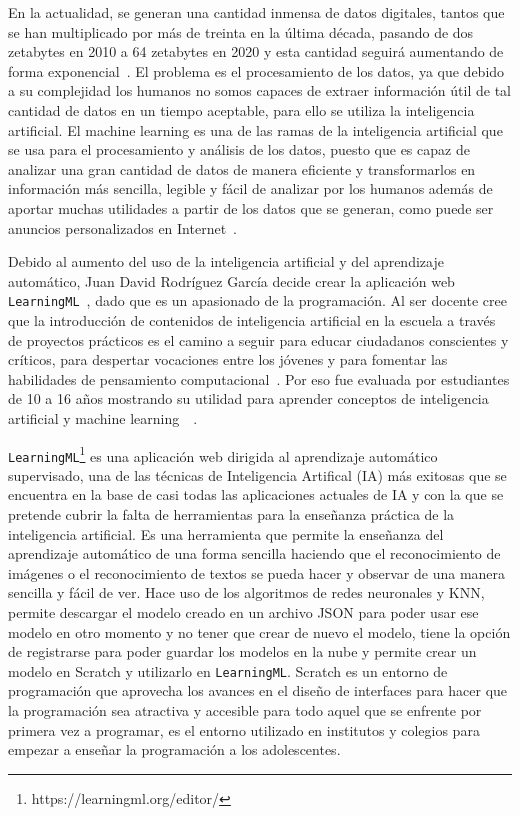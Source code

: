 \documentclass[a4paper, 12pt]{book}
\begin{document}
En la actualidad, se generan una cantidad inmensa de datos digitales, tantos que se han multiplicado por más de treinta en la última década, pasando de dos zetabytes en 2010 a 64 zetabytes en 2020 y esta cantidad seguirá aumentando de forma exponencial~\cite{Pagina_de_Datos}. 
El problema es el procesamiento de los datos, ya que debido a su complejidad los humanos no somos capaces de extraer información útil de tal cantidad de datos en un tiempo aceptable, para ello se utiliza la inteligencia artificial. 
El machine learning es una de las ramas de la inteligencia artificial que se usa para el procesamiento y análisis de los datos, puesto que es capaz de analizar una gran cantidad de datos de manera eficiente y transformarlos en información más sencilla, legible y fácil de analizar por los humanos además de aportar muchas utilidades a partir de los datos que se generan, como puede ser anuncios personalizados en Internet~\cite{rouhiainen2018inteligencia}.

Debido al aumento del uso de la inteligencia artificial y del aprendizaje automático, Juan David Rodríguez García decide crear la aplicación web \texttt{LearningML}~\cite{garcia2020learningml}, dado que es un apasionado de la programación. Al ser docente cree que la introducción de contenidos de inteligencia artificial en la escuela a través de proyectos prácticos es el camino a seguir para educar ciudadanos conscientes y críticos, para despertar vocaciones entre los jóvenes y para fomentar las habilidades de pensamiento computacional~\cite{garcia2019developing}. Por eso fue evaluada por estudiantes de 10 a 16 años mostrando su utilidad para aprender conceptos de inteligencia artificial y machine learning~\cite{Pagina_de_LearningML}~\cite{rodriguez2021evaluation}.

\texttt{LearningML}\footnote{https://learningml.org/editor/} es una aplicación web dirigida al aprendizaje automático supervisado, una de las técnicas de Inteligencia Artifical (IA) más exitosas que se encuentra en la base de casi todas las aplicaciones actuales de IA y con la que se pretende cubrir la falta de herramientas para la enseñanza práctica de la inteligencia artificial. 
Es una herramienta que permite la enseñanza del aprendizaje automático de una forma sencilla haciendo que el reconocimiento de imágenes o el reconocimiento de textos se pueda hacer y observar de una manera sencilla y fácil de ver. 
Hace uso de los algoritmos de redes neuronales y KNN, permite descargar el modelo creado en un archivo JSON para poder usar ese modelo en otro momento y no tener que crear de nuevo el modelo, tiene la opción de registrarse para poder guardar los modelos en la nube y permite crear un modelo en Scratch y utilizarlo en \texttt{LearningML}. Scratch es un entorno de programación que aprovecha los avances en el diseño de interfaces para hacer que la programación sea atractiva y accesible para todo aquel que se enfrente por primera vez a programar, es el entorno utilizado en institutos y colegios para empezar a enseñar la programación a los adolescentes.
\end{document}
